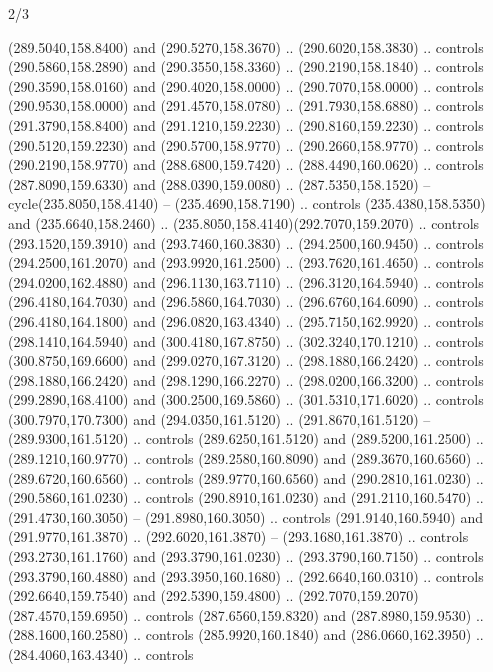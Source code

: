 \begin{flagdescription}{2/3}
\begin{scope}[xshift=0.5\flaglength,yshift=0.5\flagwidth,scale=\flagwidth/259.2]
\begin{scope}[y=0.8pt, x=0.8pt, yscale=-1,shift={(-243,-162)}]
      (289.5040,158.8400) and (290.5270,158.3670) .. (290.6020,158.3830) .. controls
      (290.5860,158.2890) and (290.3550,158.3360) .. (290.2190,158.1840) .. controls
      (290.3590,158.0160) and (290.4020,158.0000) .. (290.7070,158.0000) .. controls
      (290.9530,158.0000) and (291.4570,158.0780) .. (291.7930,158.6880) .. controls
      (291.3790,158.8400) and (291.1210,159.2230) .. (290.8160,159.2230) .. controls
      (290.5120,159.2230) and (290.5700,158.9770) .. (290.2660,158.9770) .. controls
      (290.2190,158.9770) and (288.6800,159.7420) .. (288.4490,160.0620) .. controls
      (287.8090,159.6330) and (288.0390,159.0080) .. (287.5350,158.1520) --
      cycle(235.8050,158.4140) -- (235.4690,158.7190) .. controls
      (235.4380,158.5350) and (235.6640,158.2460) ..
      (235.8050,158.4140)(292.7070,159.2070) .. controls (293.1520,159.3910) and
      (293.7460,160.3830) .. (294.2500,160.9450) .. controls (294.2500,161.2070) and
      (293.9920,161.2500) .. (293.7620,161.4650) .. controls (294.0200,162.4880) and
      (296.1130,163.7110) .. (296.3120,164.5940) .. controls (296.4180,164.7030) and
      (296.5860,164.7030) .. (296.6760,164.6090) .. controls (296.4180,164.1800) and
      (296.0820,163.4340) .. (295.7150,162.9920) .. controls (298.1410,164.5940) and
      (300.4180,167.8750) .. (302.3240,170.1210) .. controls (300.8750,169.6600) and
      (299.0270,167.3120) .. (298.1880,166.2420) .. controls (298.1880,166.2420) and
      (298.1290,166.2270) .. (298.0200,166.3200) .. controls (299.2890,168.4100) and
      (300.2500,169.5860) .. (301.5310,171.6020) .. controls (300.7970,170.7300) and
      (294.0350,161.5120) .. (291.8670,161.5120) -- (289.9300,161.5120) .. controls
      (289.6250,161.5120) and (289.5200,161.2500) .. (289.1210,160.9770) .. controls
      (289.2580,160.8090) and (289.3670,160.6560) .. (289.6720,160.6560) .. controls
      (289.9770,160.6560) and (290.2810,161.0230) .. (290.5860,161.0230) .. controls
      (290.8910,161.0230) and (291.2110,160.5470) .. (291.4730,160.3050) --
      (291.8980,160.3050) .. controls (291.9140,160.5940) and (291.9770,161.3870) ..
      (292.6020,161.3870) -- (293.1680,161.3870) .. controls (293.2730,161.1760) and
      (293.3790,161.0230) .. (293.3790,160.7150) .. controls (293.3790,160.4880) and
      (293.3950,160.1680) .. (292.6640,160.0310) .. controls (292.6640,159.7540) and
      (292.5390,159.4800) .. (292.7070,159.2070)(287.4570,159.6950) .. controls
      (287.6560,159.8320) and (287.8980,159.9530) .. (288.1600,160.2580) .. controls
      (285.9920,160.1840) and (286.0660,162.3950) .. (284.4060,163.4340) .. controls

\end{scope}
\end{scope}
\end{flagdescription}
